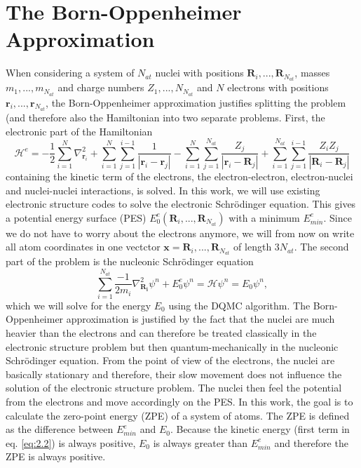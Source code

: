 \documentclass [12pt]{report}
\begin{document}
\section{The Born-Oppenheimer Approximation}
When considering a system of $N_{at}$ nuclei with positions $\bm{R}_i,...,\bm{R}_{N_{at}}$, masses $m_1,...,m_{N_{at}}$ and charge numbers $Z_1,...,N_{N_{at}}$ and $N$ electrons with positions $\bm{r}_i,...,\bm{r}_{N_{at}}$, the Born-Oppenheimer approximation justifies splitting the problem (and therefore also the Hamiltonian into two separate problems. First, the electronic part of the Hamiltonian
\begin{equation}
\mathcal{H}^e = - \frac{1}{2}\sum_{i=1}^N \nabla^2_{\bm{r}_i}  + \sum_{i=1}^{N} \sum_{j=1}^{i-1} \frac{1}{|\bm{r}_i-\bm{r}_j|} - \sum_{i=1}^{N} \sum_{j=1}^{N_{at}} \frac{Z_j}{|\bm{r}_i-\bm{R}_j|} + \sum_{i=1}^{N_{at}} \sum_{j=1}^{i-1} \frac{Z_i Z_j}{|\bm{R}_i-\bm{R}_j|}
\end{equation}
containing the kinetic term of the electrons, the electron-electron, electron-nuclei and nuclei-nuclei interactions, is solved. In this work, we will use existing electronic structure codes to solve the electronic Schrödinger equation. This gives a potential energy surface (PES) $E_0^e(\bm{R}_i,...,\bm{R}_{N_{at}})$ with a minimum $E_{min}^e$. Since we do not have to worry about the electrons anymore, we will from now on write all atom coordinates in one vectctor $\bm{x} = \bm{R}_i,...,\bm{R}_{N_{at}}$ of length $3N_{at}$.
The second part of the problem is the nucleonic Schrödinger equation
\begin{equation} \label{eq:2.2}
\sum_{i=1}^{N_{at}} \frac{-1}{2m_i} \nabla^2_{\bm{R_i}} \psi^n + E_0^e \psi^n = \mathcal{H} \psi^n = E_0 \psi^n,
\end{equation}
which we will solve for the energy $E_0$ using the DQMC algorithm. The Born-Oppenheimer approximation is justified by the fact that the nuclei are much heavier than the electrons and can therefore be treated classically in the electronic structure problem but then quantum-mechanically in the nucleonic Schrödinger equation. From the point of view of the electrons, the nuclei are basically stationary and therefore, their slow movement does not influence the solution of the electronic structure problem. The nuclei then feel the potential from the electrons and move accordingly on the PES.
In this work, the goal is to calculate the zero-point energy (ZPE) of a system of atoms. The ZPE is defined as the difference between $E_{min}^e$ and $E_0$. Because the kinetic energy (first term in eq. \eqref{eq:2.2}) is always positive, $E_0$ is always greater than $E_{min}^e$ and therefore the ZPE is always positive.
\end{document}
